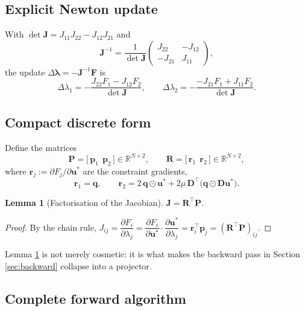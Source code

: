 \documentclass[11pt,a4paper]{article}
\newtheorem{lemma}{Lemma}
\theoremstyle{remark}
\newcommand{\R}{\mathbb{R}}
\newcommand{\us}{u^{*}}
\begin{document}
\subsection{Explicit Newton update}

With $\det\bm{J} = J_{11}J_{22} - J_{12}J_{21}$ and
\begin{equation}
\bm{J}^{-1} = \frac{1}{\det\bm{J}}
\begin{pmatrix} J_{22} & -J_{12} \\ -J_{21} & J_{11}\end{pmatrix},
\end{equation}
the update $\Delta\bm\lambda = -\bm{J}^{-1}\bm{F}$ is
\begin{equation}
\Delta\lambda_1 = -\frac{J_{22}F_1 - J_{12}F_2}{\det\bm{J}},
\qquad
\Delta\lambda_2 = -\frac{-J_{21}F_1 + J_{11}F_2}{\det\bm{J}} .
\end{equation}

\subsection{Compact discrete form}

Define the matrices
\begin{equation}
\bm{P} = \big[\,\bm{p}_1 \ \ \bm{p}_2\,\big] \in \R^{N\times2},
\qquad
\bm{R} = \big[\,\bm{r}_1 \ \ \bm{r}_2\,\big] \in \R^{N\times2},
\end{equation}
where $\bm{r}_j := \partial F_j/\partial\bm{\us}$ are the constraint gradients,
\begin{equation}
\bm{r}_1 = \bm{q},
\qquad
\bm{r}_2 = 2\,\bm{q}\odot\bm{\us} + 2\mu\,\bm{D}^\top\big(\bm{q}\odot\bm{D}\bm{\us}\big).
\label{eq:rvectors}
\end{equation}

\begin{lemma}[Factorisation of the Jacobian]
\label{lem:J}
$\bm{J} = \bm{R}^\top\bm{P}$.
\end{lemma}

\begin{proof}
By the chain rule,
$J_{ij} = \dfrac{\partial F_i}{\partial\lambda_j}
= \dfrac{\partial F_i}{\partial\bm{\us}}\cdot\dfrac{\partial\bm{\us}}{\partial\lambda_j}
= \bm{r}_i^\top\bm{p}_j = (\bm{R}^\top\bm{P})_{ij}$.
\end{proof}

\noindent
Lemma \ref{lem:J} is not merely cosmetic: it is what makes the backward pass in
Section \ref{sec:backward} collapse into a projector.

\subsection{Complete forward algorithm}
\end{document}
